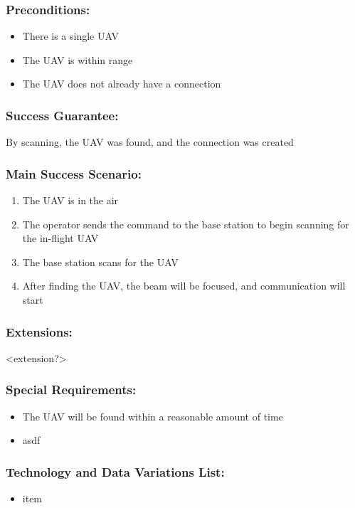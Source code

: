 \documentclass[ProductRequirements.tex]{subfiles}
\begin{document}
		\subsubsection{Preconditions:}
			\begin{itemize}\itemsep1pt
				\item There is a single UAV
				\item The UAV is within range
				\item The UAV does not already have a connection
			\end{itemize}
		\subsubsection{Success Guarantee:}
			By scanning, the UAV was found, and the connection was created
		\subsubsection{Main Success Scenario:}
			\begin{enumerate}\itemsep1pt
				\item The UAV is in the air
				\item The operator sends the command to the base station to begin scanning for the in-flight UAV
				\item The base station scans for the UAV
				\item After finding the UAV, the beam will be focused, and communication will start
			\end{enumerate}
		\subsubsection{Extensions:}
			<extension?>
		\subsubsection{Special Requirements:}
			\begin{itemize}\itemsep1pt
				\item The UAV will be found within a reasonable amount of time
				\item asdf
			\end{itemize}
		\subsubsection{Technology and Data Variations List:}
			\begin{itemize}\itemsep1pt
				\item item
			\end{itemize}
\end{document}
